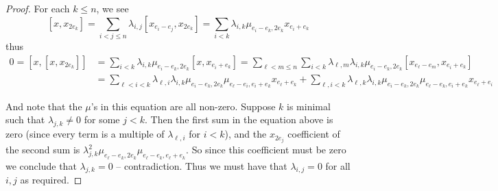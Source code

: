 \documentclass[10pt,a4paper]{amsart}
\begin{document}
\begin{proof}
For each $k\leq n$, we see $$[x,x_{2e_k}]=\underset{i<j\leq n}{\sum}\lambda_{i,j}[x_{e_i-e_j},x_{2e_k}]=\underset{i< k}{\sum}\lambda_{i,k}\mu_{e_i-e_k,2e_k}x_{e_i+e_k}$$ thus 
\begin{align*}
0=[x,[x,x_{2e_k}]]&=\underset{i< k}{\sum}\lambda_{i,k}\mu_{e_i-e_k,2e_k}[x,x_{e_i+e_k}]=\underset{\ell<m\leq n}{\sum}\underset{i< k}{\sum}\lambda_{\ell,m}\lambda_{i,k}\mu_{e_i-e_k,2e_k}[x_{e_\ell-e_m},x_{e_i+e_k}]\\&=\underset{\ell<i<k}{\sum}\lambda_{\ell,i}\lambda_{i,k}\mu_{e_i-e_k,2e_k}\mu_{e_\ell-e_i,e_i+e_k}x_{e_\ell+e_k}+\underset{\ell,i<k}{\sum}\lambda_{\ell,k}\lambda_{i,k}\mu_{e_i-e_k,2e_k}\mu_{e_\ell-e_k,e_i+e_k}x_{e_\ell+e_i}
\end{align*}

And note that the $\mu$'s in this equation are all non-zero. Suppose $k$ is minimal such that $\lambda_{j,k}\neq 0$ for some $j<k$. Then the first sum in the equation above is zero (since every term is a multiple of $\lambda_{\ell,i}$ for $i<k$), and the $x_{2e_{j}}$ coefficient of the second sum is $\lambda_{j,k}^2\mu_{e_\ell-e_k,2e_k}\mu_{e_{\ell}-e_k,e_\ell+e_k}$. So since this coefficient must be zero we conclude that $\lambda_{j,k}=0$ -- contradiction. Thus we must have that $\lambda_{i,j}=0$ for all $i,j$ as required.\end{proof}
\end{document}
